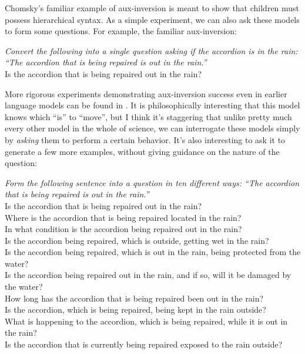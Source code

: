 \documentclass[output=paper,colorlinks,citecolor=brown
]{langscibook}
\begin{document}
Chomsky's familiar example of aux-inversion is meant to show that children must possess hierarchical syntax. As a simple experiment, we can also ask these models to form some questions. For example, the familiar aux-inversion:

\begin{myquote}
\textit{Convert the following into a single question asking if the accordion is in the rain: ``The accordion that is being repaired is out in the rain.''}\medskip\\
\noindent Is the accordion that is being repaired out in the rain?
\end{myquote}

\noindent More rigorous experiments demonstrating aux-inversion success even in earlier language models can be found in . It is philosophically interesting that this model knows which ``is'' to ``move'', but I think it's staggering that unlike pretty much every other model in the whole of science, we can interrogate these models simply by \textit{asking} them to perform a certain behavior. It's also interesting to ask it to generate a few more examples, without giving guidance on the nature of the question:

\begin{myquote}
\textit{Form the following sentence into a question in ten different ways: ``The accordion that is being repaired is out in the rain.''}\medskip\\
\noindent Is the accordion that is being repaired out in the rain?\\
Where is the accordion that is being repaired located in the rain?\\
In what condition is the accordion being repaired out in the rain?\\
Is the accordion being repaired, which is outside, getting wet in the rain?\\
Is the accordion being repaired, which is out in the rain, being protected from the water?\\
Is the accordion being repaired out in the rain, and if so, will it be damaged by the water?\\
How long has the accordion that is being repaired been out in the rain?\\
Is the accordion, which is being repaired, being kept in the rain outside?\\
What is happening to the accordion, which is being repaired, while it is out in the rain?\\
Is the accordion that is currently being repaired exposed to the rain outside?
\end{myquote}
\end{document}
